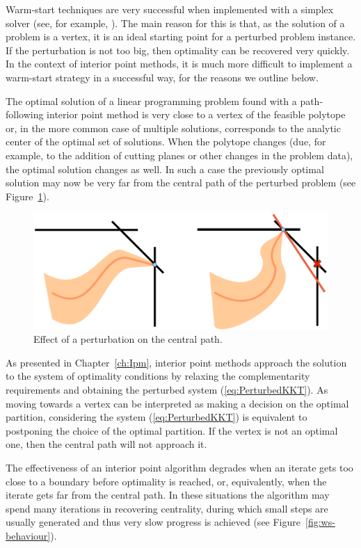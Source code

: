 Warm-start techniques are very successful 
when implemented with a simplex solver (see, for example, 
\cite{Bixby02}). 
The main reason for this is that, as the solution of a problem
is a vertex, it is an ideal starting point for a perturbed problem instance.
If the perturbation is not too big, then optimality can be recovered
very quickly.
In the context of interior point methods, it 
is much more difficult to implement a warm-start strategy in a
successful way, for the reasons
we outline below.

The optimal solution of a linear programming problem found with 
a path-following interior point method is very close to a vertex of 
the feasible polytope or, in the more common case of multiple solutions, 
corresponds to the analytic center of the optimal set of solutions.
When the polytope changes (due, for example,
to the addition of cutting planes or other changes in the 
problem data), the optimal solution changes as well.
In such a case the previously optimal solution may now be very far
from the central path of the perturbed problem
(see Figure~\ref{fig:ws-path}).

\begin{figure}[h]
\centering
\includegraphics[scale=0.75]{figures/ws-path.eps}
\caption{Effect of a perturbation on the central path.}
\label{fig:ws-path}
\end{figure}

As presented in Chapter~\ref{ch:Ipm}, interior point methods approach 
the solution to the \KKT system of optimality conditions by relaxing 
the complementarity requirements and obtaining the perturbed
system (\ref{eq:PerturbedKKT}).
As moving towards a vertex can be interpreted as making 
a decision on the optimal partition, considering the 
system (\ref{eq:PerturbedKKT}) is equivalent to postponing 
the choice of the optimal partition.
If the vertex is not an 
optimal one, then the central path will not approach it.

The effectiveness of an interior point algorithm degrades when an 
iterate gets too close to a boundary before optimality is reached,
or, equivalently, when the iterate gets far from the central path.
In these situations the algorithm may spend many iterations in recovering
centrality, during which small steps are usually generated and thus
very slow progress is achieved (see Figure~\ref{fig:ws-behaviour}).

